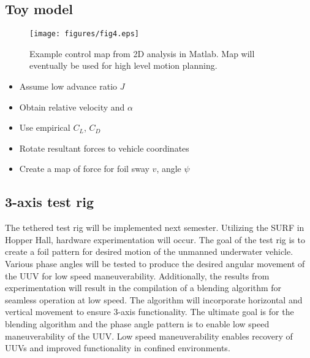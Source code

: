 \documentclass[twocolumn,10pt]{IEEEtran}
\begin{document}
\subsection{Toy model}
\begin{figure}
\begin{center}
\texttt{[image: figures/fig4.eps]}
\end{center}
\caption{Example control map from 2D analysis in Matlab. Map will eventually be used for high level motion planning.}
\end{figure}
\begin{itemize}
\item Assume low advance ratio $J$
\item Obtain relative velocity and $\alpha$
\item Use empirical $C_L$, $C_D$
\item Rotate resultant forces to vehicle coordinates
\item Create a map of force for foil sway $v$, angle $\psi$
\end{itemize}


\subsection{3-axis test rig}
The tethered test rig will be implemented next semester.  Utilizing the SURF in Hopper Hall, hardware experimentation will occur.  The goal of the test rig is to create a foil pattern for desired motion of the unmanned underwater vehicle.  Various phase angles will be tested to produce the desired angular movement of the UUV for low speed maneuverability.  Additionally, the results from experimentation will result in the compilation of a blending algorithm for seamless operation at low speed.  The algorithm will incorporate horizontal and vertical movement to ensure 3-axis functionality.  The ultimate goal is for the blending algorithm and the phase angle pattern is to enable low speed maneuverability of the UUV.  Low speed maneuverability enables recovery of UUVs and improved functionality in confined environments.  
\end{document}
